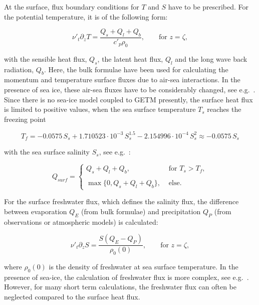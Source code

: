 At the surface, flux boundary conditions for $T$ and $S$ have to
be prescribed. For the potential temperature, it is of the following form:  

\begin{equation}\label{TempFlux}
\nu'_t \partial_z T= \frac{Q_s+Q_l+Q_b}{c'_p \rho_0},
\qquad \mbox{for } z=\zeta,
\end{equation}

with the sensible 
heat flux, $Q_s$, the 
latent heat flux, $Q_l$ and the
long wave back radiation,
$Q_b$. Here, the \cite{KONDO75} 
bulk formulae have been used for calculating the
momentum and temperature surface fluxes
due to air-sea interactions. 
In the presence of sea ice, these air-sea fluxes have to be considerably
changed, see e.g.\ \cite{KANTHAea00b}. 
Since there is no sea-ice model coupled to GETM presently,
the surface heat flux is limited to positive values, 
when the sea surface temperature $T_s$ reaches the freezing point

\begin{equation}\label{freezingpoint}
T_f=-0.0575\,S_s+1.710523\cdot 10^{-3}\, S_s^{1.5}
-2.154996\cdot 10^{-4}\,S_s^2\approx -0.0575\,S_s
\end{equation}

with the sea surface salinity $S_s$, see e.g.\ \cite{KANTHAea00}:

\begin{equation}\label{primitive_ice_model} 
Q_{surf} = \left\{
\begin{array}{ll}
Q_s+Q_l+Q_b, & \mbox{ for } T_s > T_f, \\ \\
\max\{0,Q_s+Q_l+Q_b\}, & \mbox{ else.}
\end{array}
\right.
\end{equation}

For the surface freshwater flux,
which defines the salinity flux, the difference between evaporation $Q_E$
(from 
bulk formulae) and precipitation $Q_P$ (from observations or
atmospheric models) is calculated:

\begin{equation}\label{SalFlux}
\nu'_t\partial_z S = \frac{S(Q_E-Q_P)}{\rho_0(0)},
\qquad \mbox{for } z=\zeta,
\end{equation}

where $\rho_0(0)$ is the density of freshwater at sea surface temperature.
In the presence of sea-ice, the calculation of freshwater flux
is more complex, see e.g.\ \cite{LARGEea94}.
However, for many short term calculations, the freshwater
flux can often be neglected compared to the surface 
heat flux.


